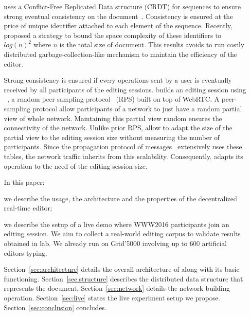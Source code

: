 \CRATE uses a Conflict\--Free Replicated Data structure (CRDT) for
sequences to ensure strong eventual consistency on the
document~\cite{shapiro2011comprehensive}. Consistency is ensured at
the price of unique identifier attached to each element of the
sequence. Recently, \LSEQ~\cite{nedelec2013lseq} proposed a strategy
to bound the space complexity of these identifiers to $log(n)^2$ where
$n$ is the total size of document. This results avoids to run costly
distributed garbage-collection-like mechanism to maintain the
efficiency of the editor.

Strong consistency is ensured if every operations sent by a user is
eventually received by all participants of the editing
sessions. \CRATE builds an editing session using
\SPRAY~\cite{nedelec2015spray}, a random peer sampling
protocol~\cite{jelasity2007gossip} (RPS) built on top of WebRTC. A
peer-sampling protocol allow participants of a network to just have a
random partial view of whole network. Maintaining this partial view
random ensures the connectivity of the network. Unlike prior RPS,
\SPRAY allow to adapt the size of the partial view to the editing
session size without measuring the number of participants. Since the
propagation protocol of messages~\cite{birman1999bimodal} extensively
uses these tables, the network traffic inherits from this
scalability. Consequently, \CRATE adapts its operation to the need of
the editing session size.

In this paper:
\begin{inparaenum}[(i)]
\item we describe the usage, the architecture and the properties of
  the \CRATE decentralized real-time editor;
\item we describe the setup of a live demo where WWW2016 participants
  join an editing session. We aim to collect a real-world editing
  corpus to validate results obtained in lab. We already run \CRATE on
  Grid'5000 involving up to 600 artificial editors typing.
\end{inparaenum}

Section~\ref{sec:architecture} details the overall architecture of \CRATE along
with its basic functioning. Section~\ref{sec:structure} describes the
distributed data structure that represents the
document. Section~\ref{sec:network} details the network building
operation. Section~\ref{sec:live} states the live experiment setup we
propose. Section~\ref{sec:conclusion} concludes.


